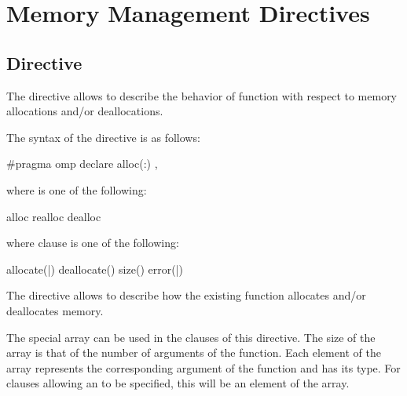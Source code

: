\section{Memory Management Directives}
\label{sec:Memory Management Directives}

\subsection{ Directive}
\label{subsec:declare alloc Directive}

\begin{ccppspecific}

\summary

The  directive allows to describe the behavior of function with respect to memory allocations and/or deallocations.

\syntax

The syntax of the  directive is as follows:

\begin{boxedcode}
#pragma omp declare alloc(\plc{[kind}:\plc{]function-name}) \plc{[clause[ [ [},\plc{] clause] ... ]]} 
\end{boxedcode}

where  is one of the following:
\begin{indentedcodelist}
alloc
realloc
dealloc
\end{indentedcodelist}

where clause is one of the following:
\begin{indentedcodelist}
allocate(|)
deallocate()
size()
error(|)
\end{indentedcodelist}

\descr

The  directive allows to describe how the existing  function allocates and/or deallocates memory.

The special array  can be used in the clauses of this directive. The size of the  array is that of the number of arguments of the  function. Each element of the array represents the corresponding argument of the function and has its type. For clauses allowing an  to be specified, this will be an element of the  array.


\end{ccppspecific}
